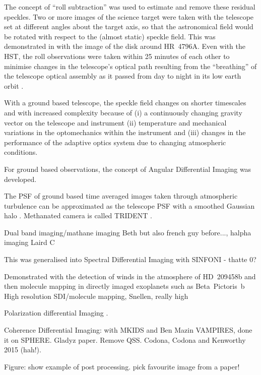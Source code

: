 \documentclass[letterpaper]{ar-1col}
\begin{document}
The concept of ``roll subtraction''  \citep{Schneider98} was used to estimate and remove these residual speckles.
%
Two or more images of the science target were taken with the telescope set at different angles about the target axis, so that the astronomical field would be rotated with respect to the (almost static) speckle field.
%
This was demonstrated in \citet{Schneider99} with the image of the disk around HR~4796A.
%
Even with the HST, the roll observations were taken within 25 minutes of each other to minimise changes in the telescope's optical path resulting from the ``breathing'' of the telescope optical assembly as it passed from day to night in its low earth orbit \citep{Bely93}.

With a ground based telescope, the speckle field changes on shorter timescales and with increased complexity because of (i) a continuously changing gravity vector on the telescope and instrument (ii) temperature and mechanical variations in the optomechanics within the instrument and (iii) changes in the performance of the adaptive optics system due to changing atmospheric conditions.

For ground based observations, the concept of Angular Differential Imaging \citep[ADI; ][]{Marois06} was developed.

The PSF of ground based time averaged images taken through atmospheric turbulence can be approximated as the telescope PSF with a smoothed Gaussian halo \citep{Marois00}.
%
Methanated camera is called TRIDENT \citep{Marois05}.

Dual band imaging/mathane imaging Beth but also french guy before..., halpha imaging Laird C

This was generalised into Spectral Differential Imaging with SINFONI - thatte 0?
\citet{Thatte07}

Demonstrated with the detection of winds in the atmosphere of HD~209458b \citep{Snellen10} and then molecule mapping in directly imaged exoplanets such as Beta~Pictoris~b \citep{Hoeijmakers18}
High resolution SDI/molecule mapping, Snellen, really high

Polarization differential Imaging \citep{Gledhill91}.

Coherence Differential Imaging: with MKIDS and Ben Mazin VAMPIRES, done it on SPHERE.
Gladyz paper. Remove QSS. Codona, Codona and Kenworthy 2015 (hah!).

Figure: show example of post processing. pick favourite image from a paper!
\end{document}
